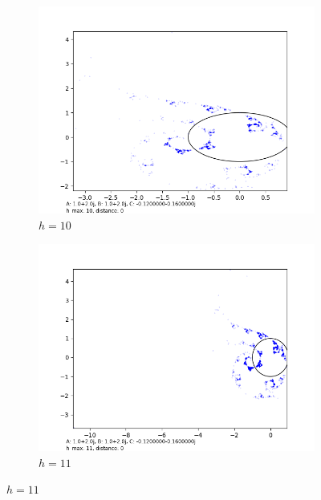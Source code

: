 \documentclass[12pt,a4paper,reqno,parskip=full]{amsart}
\numberwithin{equation}{section}
\theoremstyle{plain}
\theoremstyle{definition}
\begin{document}
\begin{figure}[H]
     \centering
     
     \begin{subfigure}[b]{0.3\textwidth}
         \centering
         \includegraphics[width=\textwidth]{images/a2b2/a2,b2,h10,d0.png}
         \caption{$h=10$}
         \label{fig:a2b2h10}
     \end{subfigure}
     \hfill
     \begin{subfigure}[b]{0.3\textwidth}
         \centering
         \includegraphics[width=\textwidth]{images/a2b2/a2,b2,h11,d0.png}
         \caption{$h=11$}
         \label{fig:a2b2h11}
     \end{subfigure}

\end{figure}
\end{document}
